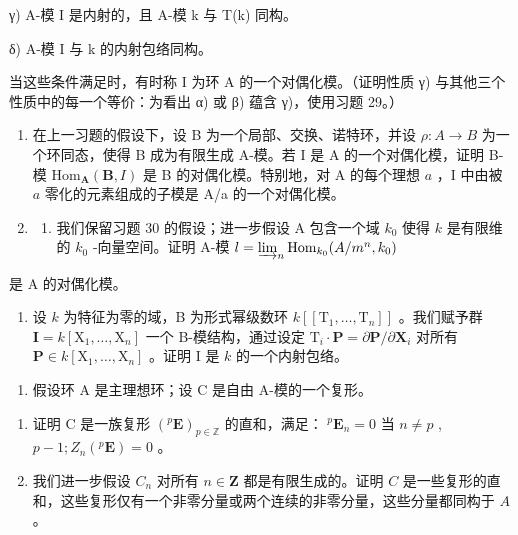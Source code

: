 γ) A-模 I 是内射的，且 A-模 k 与 T(k) 同构。

δ) A-模 I 与 k 的内射包络同构。

当这些条件满足时，有时称 I 为环 A 的一个对偶化模。（证明性质 γ) 与其他三个性质中的每一个等价：为看出 α) 或 β) 蕴含 γ)，使用习题 29。）

\begin{enumerate}
\def\labelenumi{\arabic{enumi})}
\setcounter{enumi}{30}
\item
  在上一习题的假设下，设 B 为一个局部、交换、诺特环，并设 \(\rho: A \to B\) 为一个环同态，使得 B 成为有限生成 A-模。若 I 是 A 的一个对偶化模，证明 B-模 \(\mathrm{Hom}_{\mathbf{A}}(\mathbf{B}, I)\) 是 B 的对偶化模。特别地，对 A 的每个理想 \(a\) ，I 中由被 \(a\) 零化的元素组成的子模是 A/a 的一个对偶化模。
\item
  \begin{enumerate}
  \def\labelenumii{\alph{enumii})}
  \tightlist
  \item
    我们保留习题 30 的假设；进一步假设 A 包含一个域 \(k_0\) 使得 \(k\) 是有限维的 \(k_0\) -向量空间。证明 A-模 \(l = \varinjlim_{n} \operatorname{Hom}_{k_0}(A/m^n, k_0)\)
  \end{enumerate}
\end{enumerate}

是 A 的对偶化模。

\begin{enumerate}
\def\labelenumi{\alph{enumi})}
\setcounter{enumi}{1}
\tightlist
\item
  设 \(k\) 为特征为零的域，B 为形式幂级数环 \(k[[\mathrm{T}_{1}, \ldots, \mathrm{T}_{n}]]\) 。我们赋予群 \(\mathbf{I} = k[\mathrm{X}_{1}, \ldots, \mathrm{X}_{n}]\) 一个 B-模结构，通过设定 \(\mathrm{T}_{i} \cdot \mathbf{P} = \partial \mathbf{P} / \partial \mathbf{X}_{i}\) 对所有 \(\mathbf{P} \in k[\mathrm{X}_{1}, \ldots, \mathrm{X}_{n}]\) 。证明 I 是 \(k\) 的一个内射包络。
\end{enumerate}


\begin{enumerate}
\def\labelenumi{\arabic{enumi})}
\tightlist
\item
  假设环 A 是主理想环；设 C 是自由 A-模的一个复形。
\end{enumerate}

\begin{enumerate}
\def\labelenumi{\alph{enumi})}
\item
  证明 C 是一族复形 \((^{p}\mathbf{E})_{p\in \mathbb{Z}}\) 的直和，满足： \(^{p}\mathbf{E}_{n} = 0\) 当 \(n\neq p\) , \(p - 1 ; Z_{n}(^{p}\mathbf{E}) = 0\) 。
\item
  我们进一步假设 \(C_n\) 对所有 \(n \in \mathbf{Z}\) 都是有限生成的。证明 \(C\) 是一些复形的直和，这些复形仅有一个非零分量或两个连续的非零分量，这些分量都同构于 \(A\) 。
\end{enumerate}

